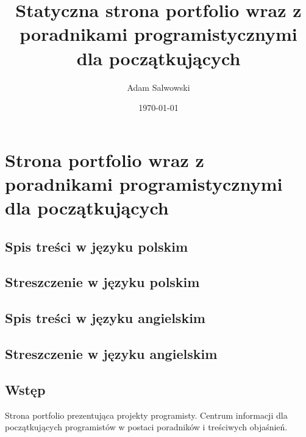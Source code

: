 \documentclass[11pt]{article}
\author{Adam Salwowski}
\date{\today}
\title{Statyczna strona portfolio wraz z poradnikami programistycznymi dla początkujących}
\begin{document}
\maketitle
\tableofcontents


\section{Strona portfolio wraz z poradnikami programistycznymi dla początkujących}
\label{sec:orgfef9a19}
\subsection{Spis treści w języku polskim}
\label{sec:org41d7fad}
\subsection{Streszczenie w języku polskim}
\label{sec:org8fbd783}
\subsection{Spis treści w języku angielskim}
\label{sec:orgd57d9a0}
\subsection{Streszczenie w języku angielskim}
\label{sec:org7c2cd7a}
\subsection{Wstęp}
\label{sec:orgb914331}
Strona portfolio prezentująca projekty programisty. Centrum informacji dla początkujących programistów w postaci poradników i treściwych objaśnień.
\end{document}
